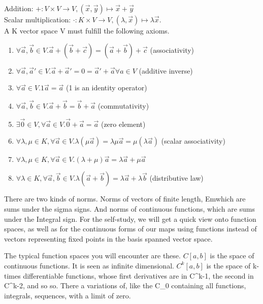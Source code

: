 \documentclass[a4paper]{article}
\begin{document}
Addition: $+: V \times V \rightarrow V, (\vec{x},\vec{y}) \mapsto \vec{x}+\vec{y}$\\
Scalar multiplication: $\cdot: K \times V \rightarrow V, (\lambda, \vec{x}) \mapsto \lambda\vec{x}$.\\

A K vector space V must fulfill the following axioms.\\

\begin{enumerate}
\label{kvs_axioms}
\item $\forall \vec{a},\vec{b} \in V. \vec{a}+(\vec{b}+\vec{c}) = (\vec{a}+\vec{b})+\vec{c}$ (associativity)
\item $\forall \vec{a},\vec{a}' \in V. \vec{a} + \vec{a}' = 0 = \vec{a}' + \vec{a} \forall a \in V$ (additive inverse)
\item $\forall \vec{a} \in V. 1\vec{a} = \vec{a}$    (1 is an identity operator)
\item $\forall \vec{a},\vec{b} \in V.  \vec{a}+\vec{b}=\vec{b}+\vec{a}$ (commutativity)
\item $\exists \vec{0} \in V,\forall \vec{a} \in V. \vec{0}+\vec{a}=\vec{a}$ (zero element)
\item $\forall \lambda,\mu \in K, \forall \vec{a} \in V. \lambda(\mu\vec{a})=\lambda\mu\vec{a}=\mu(\lambda\vec{a})$ (scalar associativity)
\item $\forall \lambda,\mu \in K, \forall \vec{a} \in V. (\lambda + \mu)\vec{a} = \lambda\vec{a}+\mu\vec{a}$
\item $\forall \lambda \in K, \forall \vec{a}, \vec{b} \in V. \lambda(\vec{a}+\vec{b}) = \lambda\vec{a}+\lambda\vec{b}$  (distributive law)
\end{enumerate}



There are two kinds of norms. Norms of vectors of finite length, Emwhich are sums under the sigma signs. And norms of continuous functions, which are sums under the Integral sign. For the self-study, we will get a quick view onto function spaces, as well as for the continuous forms of our maps using functions instead of vectors representing fixed points in the basis spanned vector space.



The typical function spaces you will encounter are these. $C[a,b]$ is the space of continuous functions. It is seen as infinite dimensional. $C^k[a,b]$ is the space of k-times differentiable functions, whose first derivatives are in C^{k-1}, the second in C^{k-2}, and so so. There a variations of, like the C_0 containing all functions, integrals, sequences, with a limit of zero.
\end{document}
